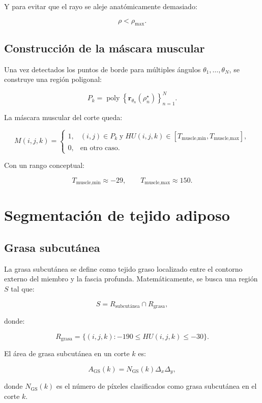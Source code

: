 \documentclass[12pt,a4paper]{article}
\begin{document}
Y para evitar que el rayo se aleje anatómicamente demasiado:

\[
\rho < \rho_{\max}.
\]

\subsection{Construcción de la máscara muscular}

Una vez detectados los puntos de borde para múltiples ángulos \(\theta_1,\ldots,\theta_N\), se construye una región poligonal:

\[
P_k =
\operatorname{poly}
\left\{
\mathbf{r}_{\theta_n}(\rho_n^\star)
\right\}_{n=1}^{N}.
\]

La máscara muscular del corte queda:

\[
M(i,j,k)=
\begin{cases}
1, & (i,j)\in P_k \;\text{y}\; HU(i,j,k)\in [T_{\text{muscle,min}},T_{\text{muscle,max}}],\\
0, & \text{en otro caso}.
\end{cases}
\]

Con un rango conceptual:

\[
T_{\text{muscle,min}}\approx -29,
\qquad
T_{\text{muscle,max}}\approx 150.
\]

\section{Segmentación de tejido adiposo}

\subsection{Grasa subcutánea}

La grasa subcutánea se define como tejido graso localizado entre el contorno externo del miembro y la fascia profunda. Matemáticamente, se busca una región \(S\) tal que:

\[
S = R_{\text{subcutánea}}\cap R_{\text{grasa}},
\]

donde:

\[
R_{\text{grasa}} =
\{(i,j,k): -190 \leq HU(i,j,k)\leq -30\}.
\]

El área de grasa subcutánea en un corte \(k\) es:

\[
A_{\text{GS}}(k)
=
N_{\text{GS}}(k)\Delta_x\Delta_y,
\]

donde \(N_{\text{GS}}(k)\) es el número de píxeles clasificados como grasa subcutánea en el corte \(k\).
\end{document}
